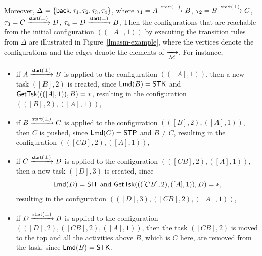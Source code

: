 \begin{example}
		Moreover, $\Delta = \{{\mathsf{back} },\tau_1, \tau_2, \tau_3, \tau_4\}$, where 
		$\tau_1 = A \xrightarrow{{\mathsf{start} }(\bot)} B$,
		$\tau_2 = B \xrightarrow{{\mathsf{start} }(\bot)} C$,
		$\tau_3 = C \xrightarrow{{\mathsf{start} }(\bot)} D$,
		$\tau_4 = D \xrightarrow{{\mathsf{start} }(\bot)} B$,
		Then the configurations that are reachable from the initial configuration $(([A], 1))$ by executing the transition rules from $\Delta$ are illustrated in Figure~\ref{lmasm-example}, where the vertices denote the configurations and the edges denote the elements of $\xrightarrow[{\mathcal{M} }]{}$. 
		For instance, 
		\begin{itemize}
			\item if $A \xrightarrow{{\mathsf{start} }(\bot)} B$ is applied to the configuration $(([A], 1))$, then a new task $([B],2)$ is created, since ${\sf Lmd}(B) = \mathsf{STK}$ and $\mathsf{GetTsk}((([A],1)), B) = *$, resulting in the configuration $(([B],2),([A],1))$,
			\item if $B \xrightarrow{{\mathsf{start} }(\bot)} C$ is applied to the configuration $(([B],2),([A],1))$, then $C$ is pushed, since ${\sf Lmd}(C) = \mathsf{STP}$ and $B\neq C$, resulting in the configuration $(([CB],2),([A],1))$,
			\item if $C \xrightarrow{{\mathsf{start} }(\bot)} D$ is applied to the configuration $(([CB],2),([A],1))$, then a new task $([D], 3)$ is created, since 
			$${\sf Lmd}(D) = \mathsf{SIT} \mbox{ and } \mathsf{GetTsk}((([CB],2),([A],1)), D) = *,$$ 
			resulting in the configuration $(([D],3),([CB],2),([A],1))$,
			\item if $D \xrightarrow{{\mathsf{start} }(\bot)} B$ is applied to the configuration $(([D],2),([CB],2),([A],1))$, then the task $([CB],2)$ is moved to the top and all the activities above $B$, which is $C$ here, are removed from the task, since ${\sf Lmd}(B) = \mathsf{STK}$, 

\end{itemize}
\end{example}
